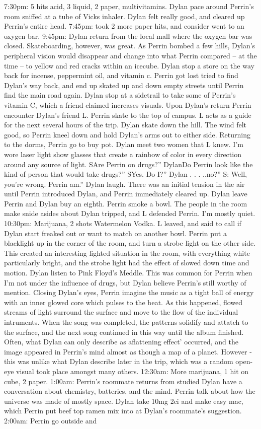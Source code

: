 \documentclass[12pt]{book}
\begin{document}
7:30pm: 5 hits acid, 3 liquid, 2 paper, multivitamins. Dylan pace around Perrin's room sniffed at a tube of Vicks inhaler. Dylan felt really good, and cleared up Perrin's entire head. 7:45pm: took 2 more paper hits, and consider went to an oxygen bar. 9:45pm: Dylan return from the local mall where the oxygen bar was closed. Skateboarding, however, was great. As Perrin bombed a few hills, Dylan's peripheral vision would disappear and change into what Perrin compared -- at the time -- to yellow and red cracks within an icecube. Dylan stop a store on the way back for incense, peppermint oil, and vitamin c. Perrin got lost tried to find Dylan's way back, and end up skated up and down empty streets until Perrin find the main road again. Dylan stop at a sidetrail to take some of Perrin's vitamin C, which a friend claimed increases visuals. Upon Dylan's return Perrin encounter Dylan's friend L. Perrin skate to the top of campus. L acts as a guide for the next several hours of the trip. Dylan skate down the hill. The wind felt good, so Perrin kneel down and hold Dylan's arms out to either side. Returning to the dorms, Perrin go to buy pot. Dylan meet two women that L knew. I'm wore laser light show glasses that create a rainbow of color in every direction around any source of light. SAre Perrin on drugs?'' DylanDo Perrin look like the kind of person that would take drugs?'' SYes. Do I?'' Dylan . . . ..no?'' S: Well, you're wrong. Perrin am.'' Dylan laugh. There was an initial tension in the air until Perrin introduced Dylan, and Perrin immediately cleared up. Dylan leave Perrin and Dylan buy an eighth. Perrin smoke a bowl. The people in the room make snide asides about Dylan tripped, and L defended Perrin. I'm mostly quiet. 10:30pm: Marijuana, 2 shots Watermelon Vodka. L leaved, and said to call if Dylan start freaked out or want to match on another bowl. Perrin put a blacklight up in the corner of the room, and turn a strobe light on the other side. This created an interesting lighted situation in the room, with everything white particularly bright, and the strobe light had the effect of slowed down time and motion. Dylan listen to Pink Floyd's Meddle. This was common for Perrin when I'm not under the influence of drugs, but Dylan believe Perrin's still worthy of mention. Closing Dylan's eyes, Perrin imagine the music as a tight ball of energy with an inner glowed core which pulses to the beat. As this happened, flowed streams of light surround the surface and move to the flow of the individual intruments. When the song was completed, the patterns solidify and attatch to the surface, and the next song continued in this way until the album finished. Often, what Dylan can only describe as aflattening effect' occurred, and the image appeared in Perrin's mind almost as though a map of a planet. However - this was unlike what Dylan describe later in the trip, which was a random open-eye visual took place amongst many others. 12:30am: More marijuana, 1 hit on cube, 2 paper. 1:00am: Perrin's roommate returns from studied Dylan have a conversation about chemistry, batteries, and the mind. Perrin talk about how the universe was made of mostly space. Dylan take 10mg 2ci and make easy mac, which Perrin put beef top ramen mix into at Dylan's roommate's suggestion. 2:00am: Perrin go outside and 
\end{document}
